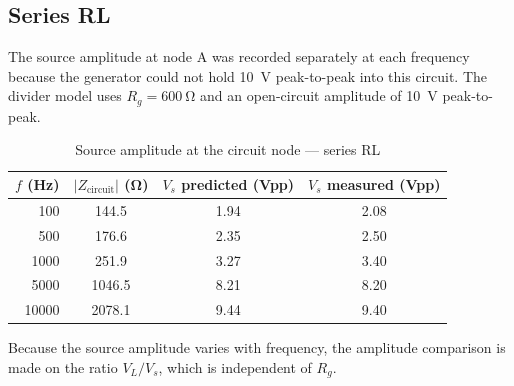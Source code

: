 \documentclass[11pt]{article}
\begin{document}
\subsection*{Series RL}

The source amplitude at node A was recorded separately at each frequency because
the generator could not hold \SI{10}{\volt} peak-to-peak into this circuit. The
divider model uses $R_g = \SI{600}{\ohm}$ and an open-circuit amplitude of
\SI{10}{\volt} peak-to-peak.

\begin{table}[H]
    \centering
    \caption{Source amplitude at the circuit node --- series RL}
    \begin{tabular}{rccc}
        \toprule
        $f$ (Hz) & $|Z_{\text{circuit}}|$ (\si{\ohm}) & $V_s$ predicted (Vpp) & $V_s$ measured (Vpp) \\
        \midrule
        100   & 144.5  & 1.94 & 2.08 \\
        500   & 176.6  & 2.35 & 2.50 \\
        1000  & 251.9  & 3.27 & 3.40 \\
        5000  & 1046.5 & 8.21 & 8.20 \\
        10000 & 2078.1 & 9.44 & 9.40 \\
        \bottomrule
    \end{tabular}
\end{table}

Because the source amplitude varies with frequency, the amplitude comparison is
made on the ratio $V_L / V_s$, which is independent of $R_g$.
\end{document}
